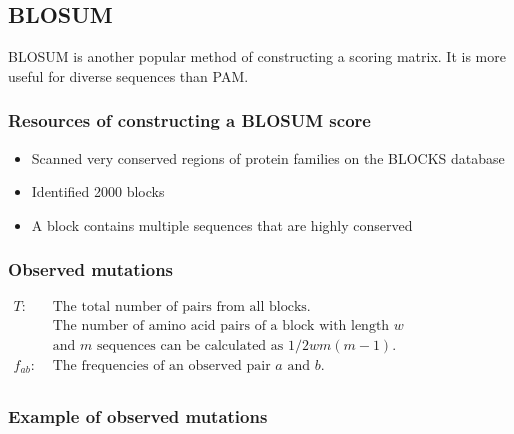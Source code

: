 %
%

%
%
\subsection{BLOSUM}
BLOSUM is another popular method of constructing a scoring matrix. It is more useful for diverse sequences than PAM.

%
%
\subsubsection*{Resources of constructing a BLOSUM score}
\begin{itemize}
\item Scanned very conserved regions of protein families on the BLOCKS database
\item Identified 2000 blocks
\item A block contains multiple sequences that are highly conserved
\end{itemize}

%
%
\subsubsection*{Observed mutations}

\begin{center}
$\begin{aligned}
T : & \text{ The total number of pairs from all blocks.} \\
& \text{ The number of amino acid pairs of a block with length } w \\
& \text{ and } m \text{ sequences can be calculated as } 1/2wm(m-1). \\
f_{ab} : & \text{ The frequencies of an observed pair } a \text{ and } b.\\
\end{aligned} $
\end{center}

%
%
\subsubsection*{Example of observed mutations}


